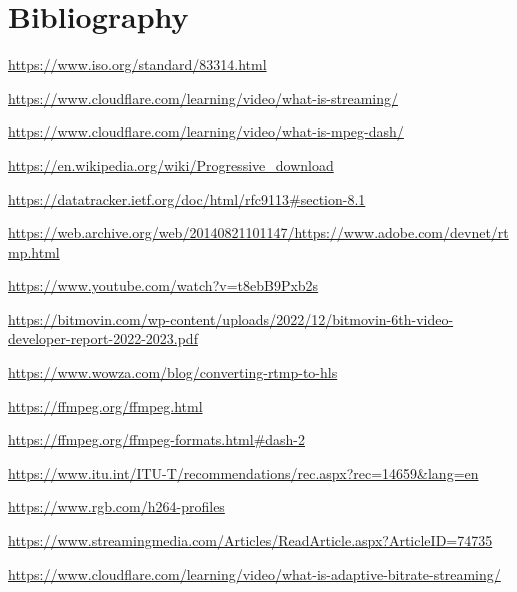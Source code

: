 \documentclass{article}
\begin{document}
\section*{Bibliography}

\begin{thebibliography}{}

\item \url{https://www.iso.org/standard/83314.html}

\item \url{https://www.cloudflare.com/learning/video/what-is-streaming/}

\item \url{https://www.cloudflare.com/learning/video/what-is-mpeg-dash/}

\item \url{https://en.wikipedia.org/wiki/Progressive_download}

\item \url{https://datatracker.ietf.org/doc/html/rfc9113#section-8.1}

\item \url{https://web.archive.org/web/20140821101147/https://www.adobe.com/devnet/rtmp.html}

\item \url{https://www.youtube.com/watch?v=t8ebB9Pxb2s}

\item \url{https://bitmovin.com/wp-content/uploads/2022/12/bitmovin-6th-video-developer-report-2022-2023.pdf}

\item \url{https://www.wowza.com/blog/converting-rtmp-to-hls}

\item \url{https://ffmpeg.org/ffmpeg.html}

\item \url{https://ffmpeg.org/ffmpeg-formats.html#dash-2}

\item \url{https://www.itu.int/ITU-T/recommendations/rec.aspx?rec=14659&lang=en}

\item \url{https://www.rgb.com/h264-profiles}

\item \url{https://www.streamingmedia.com/Articles/ReadArticle.aspx?ArticleID=74735}

\item \url{https://www.cloudflare.com/learning/video/what-is-adaptive-bitrate-streaming/}


\end{thebibliography}
\end{document}
